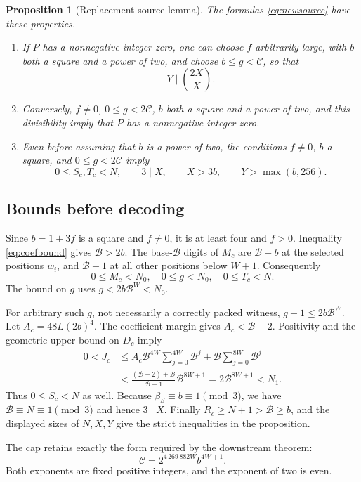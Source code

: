 \documentclass[11pt,letterpaper]{article}
\newcommand{\B}{\mathcal B}
\newcommand{\capc}{\mathscr C}
\newtheorem{proposition}[theorem]{Proposition}
\theoremstyle{remark}
\begin{document}
\begin{proposition}[Replacement source lemma]
\label{prop:source}
The formulas \eqref{eq:newsource} have these properties.
\begin{enumerate}
\item If \(P\) has a nonnegative integer zero, one can choose \(f\)
arbitrarily large, with \(b\) both a square and a power of two, and
choose \(b\le g<\capc\), so that
\[
Y\mid\binom{2X}{X}.
\]
\item Conversely, \(f\ne0\), \(0\le g<2\capc\), \(b\) both a square
and a power of two, and this divisibility imply that \(P\) has a
nonnegative integer zero.
\item Even before assuming that \(b\) is a power of two, the conditions
\(f\ne0\), \(b\) a square, and \(0\le g<2\capc\) imply
\[
0\le S_c,T_c<N,\qquad 3\mid X,\qquad
X>3b,\qquad Y>\max(b,256).
\]
\end{enumerate}
\end{proposition}

\subsection{Bounds before decoding}

Since \(b=1+3f\) is a square and \(f\ne0\), it is at least four and
\(f>0\). Inequality \eqref{eq:coefbound} gives \(\B>2b\).
The base-\(\B\) digits of \(M_c\) are \(\B-b\) at the selected positions
\(w_i\), and \(\B-1\) at all other positions below \(W+1\).
Consequently
\[
0\le M_c<N_0,\quad 0\le g<N_0,\quad 0\le T_c<N.
\]
The bound on \(g\) uses \(g<2b\B^W<N_0\).

For arbitrary such \(g\), not necessarily a correctly packed witness,
\(g+1\le2b\B^W\). Let \(A_c=48L(2b)^4\). The coefficient margin gives
\(A_c<\B-2\). Positivity and the geometric upper bound on \(D_c\) imply
\[
\begin{split}
0<J_c
&\le A_c\B^{4W}\sum_{j=0}^{4W}\B^j+
       \B\sum_{j=0}^{8W}\B^j\\
&<\frac{(\B-2)+\B}{\B-1}\B^{8W+1}
 =2\B^{8W+1}<N_1.
\end{split}
\]
Thus \(0\le S_c<N\) as well. Because \(\beta_S\equiv b\equiv1\pmod3\),
we have \(\B\equiv N\equiv1\pmod3\) and hence \(3\mid X\).
Finally \(R_c\ge N+1>\B\ge b\), and the displayed sizes of \(N,X,Y\)
give the strict inequalities in the proposition.

The cap retains exactly the form required by the downstream theorem:
\begin{equation}
\capc=2^{4\,269\,882W}b^{4W+1}.
\label{eq:capform}
\end{equation}
Both exponents are fixed positive integers, and the exponent of two
is even.
\end{document}
